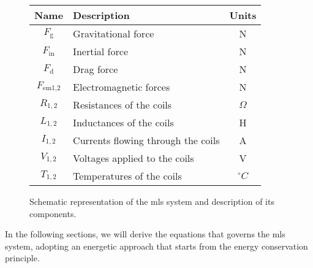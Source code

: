 \begin{figure}[H]
\begin{minipage}{0.55\textwidth}
        \begin{tabular}{|c|l|c|}
            \hline
            \textbf{Name}      & \textbf{Description}               & \textbf{Units} \\
            \hline
            $F_{\text{g}}$     & Gravitational force                & N              \\
            $F_{\text{in}}$    & Inertial force                     & N              \\
            $F_{\text{d}}$     & Drag force                         & N              \\
            $F_{\text{em1,2}}$ & Electromagnetic forces             & N              \\
            \hline
            $R_{1,2}$          & Resistances of the coils           & $\Omega$       \\
            $L_{1,2}$          & Inductances of the coils           & H              \\
            $I_{1,2}$          & Currents flowing through the coils & A              \\
            $V_{1,2}$          & Voltages applied to the coils      & V              \\
            $T_{1,2}$          & Temperatures of the coils          & $^\circ C$     \\
            \hline
        \end{tabular}

    \end{minipage}

    \caption{Schematic representation of the \acrshort{mls} system and description of its components.}
    \label{fig:system_model}
    \label{tab:components}

\end{figure}


In the following sections, we will derive the equations that governs the \acrshort{mls} system, adopting an energetic approach that starts from the energy conservation principle.




